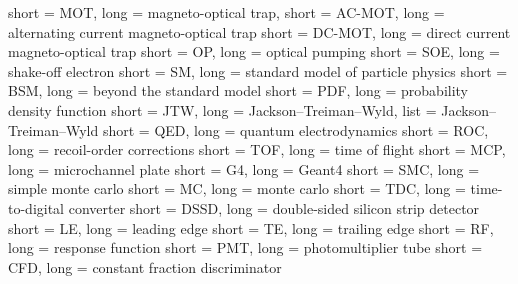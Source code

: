 % 
% 
% 

{
	short = MOT,
	long = magneto-optical trap,
}
{
	short = AC-MOT,
	long = alternating current magneto-optical trap
}
{
	short = DC-MOT,
	long = direct current magneto-optical trap
}
{
	short = OP,
	long = optical pumping
}
{
	short = SOE,
	long = shake-off electron
}
{
	short = SM,
	long = standard model of particle physics
}
{
	short = BSM,
	long = beyond the standard model
}
{
	short = PDF,
	long = probability density function
}
{
	short = JTW,
	long = Jackson--Treiman--Wyld,
	list = Jackson--Treiman--Wyld \cite{jtw}\cite{jtw_coulomb}
}
{
	short = QED,
	long = quantum electrodynamics
}
{
	short = ROC,
	long = recoil-order corrections
}
{
	short = TOF,
	long = time of flight
}
{
	short = MCP,
	long = microchannel plate
}
{
	short = G4,
	long = Geant4
}
{
	short = SMC,
	long = simple monte carlo
}
{
	short = MC,
	long = monte carlo
}
{
	short = TDC,
	long = time-to-digital converter
}
{
	short = DSSD,
	long = double-sided silicon strip detector
}
{
	short = LE,
	long = leading edge
}
{
	short = TE,
	long = trailing edge
}
{
	short = RF,
	long = response function
}
{
	short = PMT,
	long = photomultiplier tube
}
{
	short = CFD,
	long = constant fraction discriminator
}













